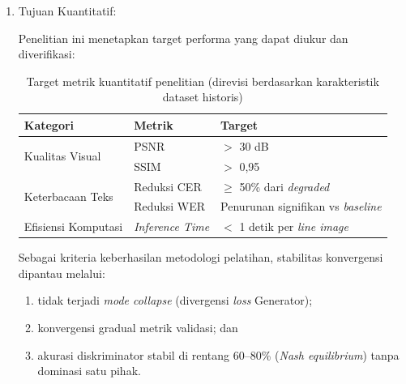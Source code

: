 \begin{enumerate}[label=\arabic*., leftmargin=*, labelindent=0pt, itemsep=1ex, topsep=0pt]

\item Tujuan Kuantitatif:

Penelitian ini menetapkan target performa yang dapat diukur dan diverifikasi:

\begin{table}[H]
    \centering
    \caption[Target Metrik Kuantitatif Penelitian]{Target metrik kuantitatif penelitian (direvisi berdasarkan karakteristik dataset historis)}
    \label{tab:target-metrik}
    \normalsize
    \begin{tabular}{|l|l|l|}
        \hline
        Kategori                          & Metrik         & Target                                           \\ \hline
        \multirow{2}{*}{Kualitas Visual}  & PSNR           & $>$ 30 dB \footnotemark[1]                       \\ \cline{2-3}
                                          & SSIM           & $>$ 0,95                                         \\ \hline
        \multirow{2}{*}{Keterbacaan Teks} & Reduksi CER    & $\geq$ 50\% dari \textit{degraded} \footnotemark[2] \\ \cline{2-3}
                                          & Reduksi WER    & Penurunan signifikan vs \textit{baseline}       \\ \hline
        Efisiensi Komputasi               & \textit{Inference Time} & $<$ 1 detik per \textit{line image}  \\ \hline
    \end{tabular}
\end{table}


Sebagai kriteria keberhasilan metodologi pelatihan, stabilitas konvergensi dipantau melalui:
\begin{enumerate}[label=(\alph*), leftmargin=*, nosep]
    \item tidak terjadi \textit{mode collapse} (divergensi \textit{loss} Generator);
    \item konvergensi gradual metrik validasi; dan
    \item akurasi diskriminator stabil di rentang 60--80\% (\textit{Nash equilibrium}) tanpa dominasi satu pihak.
\end{enumerate}


\end{enumerate}
